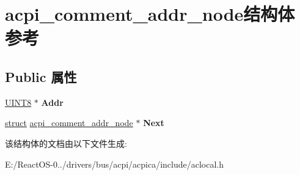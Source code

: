 \hypertarget{structacpi__comment__addr__node}{}\section{acpi\+\_\+comment\+\_\+addr\+\_\+node结构体 参考}
\label{structacpi__comment__addr__node}
\subsection*{Public 属性}
\begin{DoxyCompactItemize}
\item 
\mbox{\label{structacpi__comment__addr__node_aed7072353444e9e06110c2a9a8e29611}} 
\hyperlink{_processor_bind_8h_ab27e9918b538ce9d8ca692479b375b6a}{U\+I\+N\+T8} $\ast$ {\bfseries Addr}
\item 
\mbox{\label{structacpi__comment__addr__node_a9132b03407aa4e3911bf423213f3ff4c}} 
\hyperlink{interfacestruct}{struct} \hyperlink{structacpi__comment__addr__node}{acpi\+\_\+comment\+\_\+addr\+\_\+node} $\ast$ {\bfseries Next}
\end{DoxyCompactItemize}


该结构体的文档由以下文件生成\+:\begin{DoxyCompactItemize}
\item 
E\+:/\+React\+O\+S-\/0../drivers/bus/acpi/acpica/include/aclocal.\+h\end{DoxyCompactItemize}
